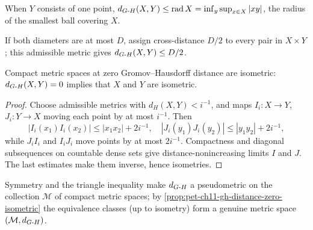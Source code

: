 \begin{example}
  \label{ex:pet-ch11-gh-distance-radius}
  When $Y$ consists of one point,
  $d_{G\text{-}H}(X,Y)\le\operatorname{rad}X=\inf_{y}\sup_{x\in X}|xy|$, the radius of
  the smallest ball covering $X$.
\end{example}

\begin{example}
  \label{ex:pet-ch11-gh-distance-diameter-bound}
  If both diameters are at most $D$, assign cross-distance $D/2$ to every
  pair in $X\times Y$; this admissible metric gives $d_{G\text{-}H}(X,Y)\le D/2$.
\end{example}

\begin{proposition}
  \label{prop:pet-ch11-gh-distance-zero-isometric}
  Compact metric spaces at zero Gromov--Hausdorff distance are isometric:
  $d_{G\text{-}H}(X,Y)=0$ implies that $X$ and $Y$ are isometric.
\end{proposition}
\begin{proof}
  \sketch
  Choose admissible metrics with \(d_H(X,Y)<i^{-1}\), and maps \(I_i:X\to Y\), \(J_i:Y\to X\) moving each point by at most \(i^{-1}\). Then
  \[
    |I_i(x_1)I_i(x_2)|\le |x_1x_2|+2i^{-1},\quad
    |J_i(y_1)J_i(y_2)|\le |y_1y_2|+2i^{-1},
  \]
  while \(J_iI_i\) and \(I_iJ_i\) move points by at most \(2i^{-1}\). Compactness and diagonal subsequences on countable dense sets give distance-nonincreasing limits \(I\) and \(J\). The last estimates make them inverse, hence isometries.
\end{proof}


\begin{remark}
  \label{rem:pet-ch11-gh-pseudo-metric-quotient}
  Symmetry and the triangle inequality make $d_{G\text{-}H}$ a pseudometric on the
  collection $\mathcal{M}$ of compact metric
  spaces; by \cref{prop:pet-ch11-gh-distance-zero-isometric} the equivalence
  classes (up to isometry) form a genuine metric space $(\mathcal{M},d_{G\text{-}H})$.
\end{remark}

